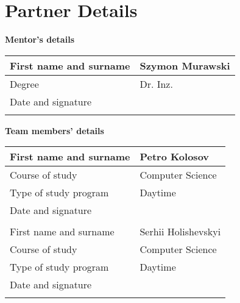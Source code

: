 \chapter*{Partner Details}\label{ch:partner-details}
\begin{description}
    \item \hspace*{8mm}\textbf{Mentor's details} \\

    \begin{tabular}{|p{}|p{}|}
        \hline
        First name and surname & Szymon Murawski \\
        \hline
        Degree                 & Dr. Inz.        \\
        \hline
        Date and signature     &                 \\
        \hline
        \multicolumn{2}{c}{\vspace{0.5cm}} \\
    \end{tabular}
    \item \hspace*{8mm}\textbf{Team members' details} \\

    \begin{tabular}{|p{}|p{}|}
        \hline
        First name and surname & Petro Kolosov        \\
        \hline
        Course of study        & Computer Science     \\
        \hline
        Type of study program  & Daytime              \\
        \hline
        Date and signature     &                      \\
        \hline

        \multicolumn{2}{c}{\vspace{0.5cm}} \\

        \hline
        First name and surname & Serhii Holishevskyi  \\
        \hline
        Course of study        & Computer Science     \\
        \hline
        Type of study program  & Daytime              \\
        \hline
        Date and signature     &                      \\
        \hline

        \multicolumn{2}{c}{\vspace{0.5cm}} \\


\end{tabular}
\end{description}
